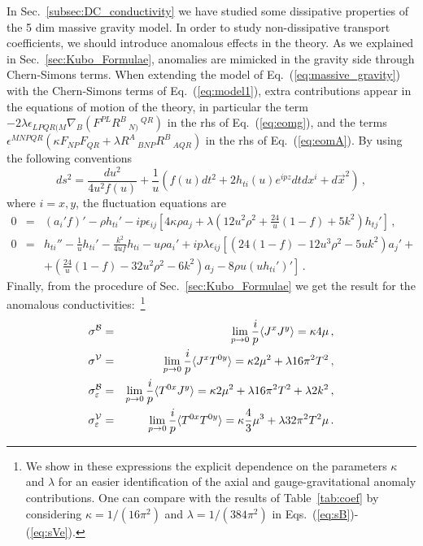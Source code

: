 \documentclass[a4paper]{jpconf}
\begin{document}
In Sec.~\ref{subsec:DC_conductivity} we have studied some dissipative properties of the 5 dim massive gravity model. In order to study non-dissipative transport coefficients, we should introduce anomalous effects in the theory. As we explained in Sec.~\ref{sec:Kubo_Formulae}, anomalies are mimicked in the gravity side through Chern-Simons terms. When extending the model of Eq.~(\ref{eq:massive_gravity}) with the Chern-Simons terms of Eq.~(\ref{eq:model1}), extra contributions appear in the equations of motion of the theory, in particular the term $- 2 \lambda \epsilon_{LPQR(M} \nabla_B \left( F^{PL}R^B\,_{N)}\,^{QR}\right)$ in the rhs of Eq.~(\ref{eq:eomg}), and the terms $\epsilon^{MNPQR} (\kappa F_{NP} F_{QR} + \lambda R^A\,_{BNP} R^B\,_{AQR})$ in the rhs of Eq.~(\ref{eq:eomA}). By using the following conventions
\begin{equation}
ds^2 = \frac{du^2}{4 u^2 f(u)} + \frac{1}{u} \left( f(u) dt^2 + 2 h_{ti}(u) e^{i p z} dt dx^i + d\vec{x}^2 \right) \,,
\end{equation}
where $i=x,y$, the fluctuation equations are
\begin{eqnarray}
0 &=& (a_i' f)' - \rho h_{ti}'  - i p \epsilon_{ij} \left[ 4 \kappa \rho a_j + \lambda\left(12 u^2 \rho^2 + \frac{24}{u} (1-f) + 5k^2 \right) h_{tj}' \right]  \,, \label{eq:fluca}\\
0 &=& h_{ti}'' -\frac 1 u h_{ti}' -\frac{k^2}{4 u f} h_{ti} - u \rho a_i' + i p \lambda \epsilon_{ij} \left[\left(24(1-f) -12 u^3 \rho^2 - 5 u k^2 \right) a_j' + \right.\nonumber \\
 && + \left. \left( \frac{24}{u} (1-f) - 32 u^2 \rho^2 - 6k^2\right) a_j - 8 \rho u (u h_{ti}')' \right] \,.
\end{eqnarray}
Finally, from the procedure of Sec.~\ref{sec:Kubo_Formulae} we get the result for the anomalous conductivities:~\footnote{We show in these expressions the explicit dependence on the parameters $\kappa$ and $\lambda$ for an easier identification of the axial and gauge-gravitational anomaly contributions. One can compare with the results of Table~\ref{tab:coef} by considering $\kappa=1/(16\pi^2)$ and $\lambda= 1/(384\pi^2)$ in Eqs.~(\ref{eq:sB})-(\ref{eq:sVe}).}
\begin{eqnarray}
 \sigma^{\cal B} &=&  \lim_{p\to 0} \frac{i}{p} \langle J^x J^y\rangle = \kappa 4\mu  \,, \label{eq:sB} \\
\sigma^{\cal V} &=&   \lim_{p\to 0}  \frac{i}{p} \langle J^x T^{0y} \rangle = \kappa 2\mu^2 + \lambda 16\pi^2 T^2  \,, \label{eq:sV}  \\
 \sigma_\varepsilon^{\cal B} &=&  \lim_{p\to 0}  \frac{i}{p} \langle T^{0x} J^y \rangle =  \kappa 2\mu^2 +\lambda 16 \pi^2 T^2 + \lambda 2 k^2 \,, \label{eq:sBe} \\
\sigma_\varepsilon^{\cal V} &=&  \lim_{p\to 0}  \frac{i}{p} \langle T^{0x} T^{0y} \rangle = \kappa \frac{4}{3}\mu^3 + \lambda 32\pi^2 T^2 \mu \,. \label{eq:sVe}
\end{eqnarray}
\end{document}
